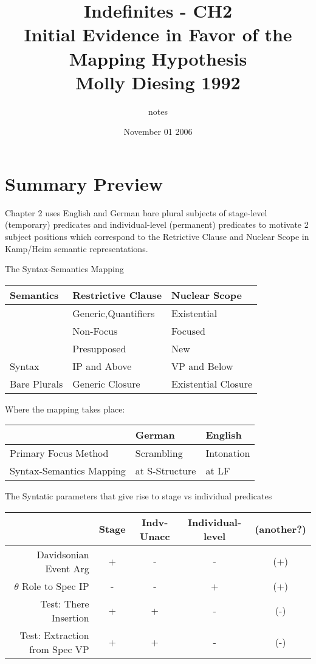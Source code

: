 \documentclass[landscape]{article}
\author{notes}
\title {Indefinites - CH2 \\Initial Evidence in Favor of the Mapping Hypothesis\\Molly Diesing 1992}
\date{November 01 2006}
\begin{document}
\maketitle

\section*{Summary Preview}
Chapter 2 uses English and German bare plural subjects of  stage-level (temporary) predicates and individual-level (permanent) predicates to motivate 2 subject positions which correspond to the Retrictive Clause and Nuclear Scope in Kamp/Heim semantic representations.



\begin{example}The Syntax-Semantics Mapping\\
\begin{tabular}{|l|ll|}\hline
Semantics & Restrictive Clause  & Nuclear Scope\\\hline\hline
& Generic,Quantifiers  & Existential\\
& Non-Focus   & Focused\\
& Presupposed  & New\\\hline
Syntax & IP and Above  & VP and Below\\\hline\hline
Bare Plurals & Generic Closure & Existential Closure\\\hline
\end{tabular}
\end{example}

\begin{example}Where the mapping takes place:\\
\begin{tabular}{|l||l|l|}\hline
& German & English\\\hline\hline
Primary Focus Method& Scrambling  & Intonation\\
Syntax-Semantics Mapping & at S-Structure& at LF \\\hline
\end{tabular}
\end{example}

\begin{example}The Syntatic parameters that give rise to stage vs individual predicates
\begin{tabular}{|r||c|c|c|c|}\hline
& Stage & Indv-Unacc & Individual-level& (another?)\\\hline\hline
Davidsonian Event Arg & + & - & - & (+)\\\hline
$\theta$ Role to Spec IP & - & - & + & (+)\\
Test: There Insertion & + & + & - & (-)\\ 
Test: Extraction from Spec VP & + & + & -& (-)\\\hline
\end{tabular}
\end{example}
\end{document}
